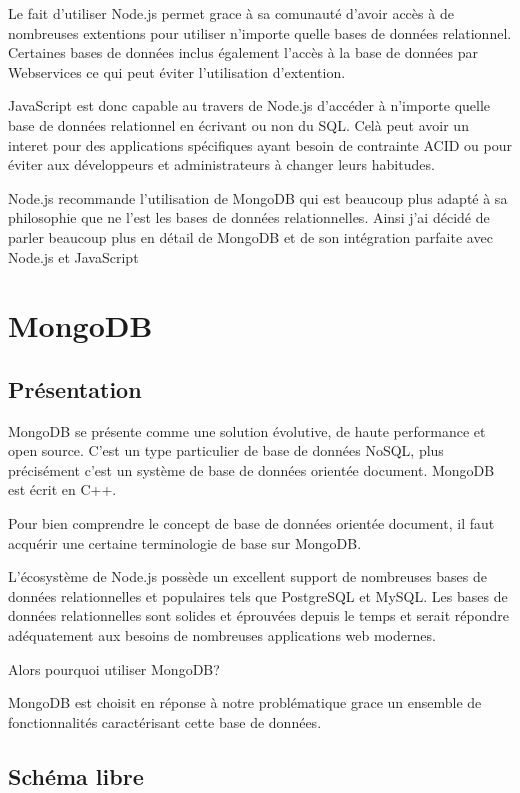 Le fait d'utiliser Node.js permet grace à sa comunauté d'avoir accès à de nombreuses extentions pour utiliser n'importe quelle bases de données relationnel.
Certaines bases de données inclus également l'accès à la base de données par Webservices ce qui peut éviter l'utilisation d'extention.

JavaScript est donc capable au travers de Node.js d'accéder à n'importe quelle base de données relationnel en écrivant ou non du SQL. Celà peut avoir un interet pour des applications spécifiques ayant besoin de contrainte ACID ou pour éviter aux développeurs et administrateurs à changer leurs habitudes.

Node.js recommande l'utilisation de MongoDB qui est beaucoup plus adapté à sa philosophie que ne l'est les bases de données relationnelles. Ainsi j'ai décidé de parler beaucoup plus en détail de MongoDB et de son intégration parfaite avec Node.js et JavaScript 


\section{MongoDB}
\label{ch:mongodb}

\subsection{Présentation}

MongoDB se présente comme une solution évolutive, de haute performance et open source. C’est un type particulier de base de données NoSQL, plus précisément c’est un système de base de données orientée document. MongoDB est écrit en C++.

Pour bien comprendre le concept de base de données orientée document, il faut acquérir une certaine terminologie de base sur MongoDB. 

L’écosystème de Node.js possède un excellent support de nombreuses bases de données relationnelles et populaires tels que PostgreSQL et MySQL. Les bases de données relationnelles sont solides et éprouvées depuis le temps et serait répondre adéquatement aux besoins de nombreuses applications web modernes.

Alors pourquoi utiliser MongoDB? 
 
MongoDB est choisit en réponse à notre problématique grace un ensemble de fonctionnalités caractérisant cette base de données. 

\subsection{Schéma libre}

